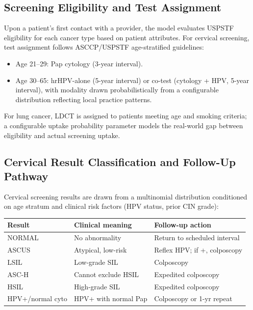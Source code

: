 \documentclass[12pt]{article}
\begin{document}
\subsection{Screening Eligibility and Test Assignment}

Upon a patient's first contact with a provider, the model evaluates
USPSTF eligibility for each cancer type based on patient attributes.
For cervical screening, test assignment follows ASCCP/USPSTF age-stratified
guidelines:
\begin{itemize}[leftmargin=2em]
  \item Age 21--29: Pap cytology (3-year interval).
  \item Age 30--65: hrHPV-alone (5-year interval) or co-test
        (cytology + HPV, 5-year interval), with modality drawn
        probabilistically from a configurable distribution reflecting
        local practice patterns.
\end{itemize}
For lung cancer, LDCT is assigned to patients meeting age and smoking
criteria; a configurable uptake probability parameter models the
real-world gap between eligibility and actual screening uptake.

\subsection{Cervical Result Classification and Follow-Up Pathway}

Cervical screening results are drawn from a multinomial distribution
conditioned on age stratum and clinical risk factors (HPV status,
prior CIN grade):

\begin{center}
\begin{tabular}{lll}
  \toprule
  \textbf{Result} & \textbf{Clinical meaning} & \textbf{Follow-up action} \\
  \midrule
  NORMAL          & No abnormality             & Return to scheduled interval \\
  ASCUS           & Atypical, low-risk         & Reflex HPV; if +, colposcopy \\
  LSIL            & Low-grade SIL              & Colposcopy \\
  ASC-H           & Cannot exclude HSIL        & Expedited colposcopy \\
  HSIL            & High-grade SIL             & Expedited colposcopy \\
  HPV+/normal cyto & HPV+ with normal Pap      & Colposcopy or 1-yr repeat \\
  \bottomrule
\end{tabular}
\end{center}
\end{document}
